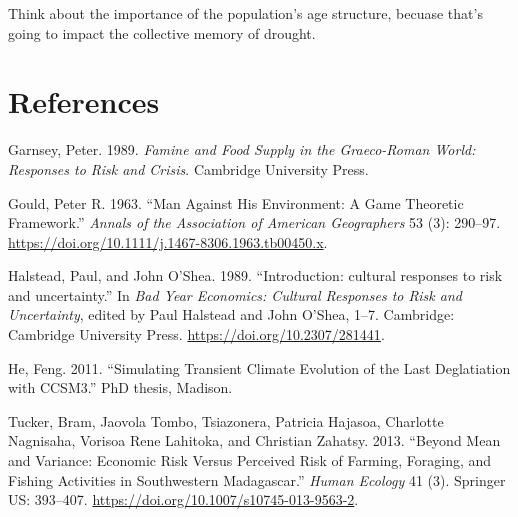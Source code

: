 \documentclass[smallextended]{svjour3}       %
\begin{document}
Think about the importance of the population's age structure, becuase
that's going to impact the collective memory of drought.

\setlength{\parindent}{-0.5in}
\setlength{\leftskip}{0.5in}
\setlength{\parskip}{8pt}

\hypertarget{references}{%
\section*{References}\label{references}}

\hypertarget{refs}{}
\leavevmode\hypertarget{ref-Garnsey1989}{}%
Garnsey, Peter. 1989. \emph{Famine and Food Supply in the Graeco-Roman
World: Responses to Risk and Crisis}. Cambridge University Press.

\leavevmode\hypertarget{ref-GOULD1963a}{}%
Gould, Peter R. 1963. ``Man Against His Environment: A Game Theoretic
Framework.'' \emph{Annals of the Association of American Geographers} 53
(3): 290--97. \url{https://doi.org/10.1111/j.1467-8306.1963.tb00450.x}.

\leavevmode\hypertarget{ref-Halstead1989}{}%
Halstead, Paul, and John O'Shea. 1989. ``Introduction: cultural
responses to risk and uncertainty.'' In \emph{Bad Year Economics:
Cultural Responses to Risk and Uncertainty}, edited by Paul Halstead and
John O'Shea, 1--7. Cambridge: Cambridge University Press.
\url{https://doi.org/10.2307/281441}.

\leavevmode\hypertarget{ref-He2011}{}%
He, Feng. 2011. ``Simulating Transient Climate Evolution of the Last
Deglatiation with CCSM3.'' PhD thesis, Madison.

\leavevmode\hypertarget{ref-Tucker2013}{}%
Tucker, Bram, Jaovola Tombo, Tsiazonera, Patricia Hajasoa, Charlotte
Nagnisaha, Vorisoa Rene Lahitoka, and Christian Zahatsy. 2013. ``Beyond
Mean and Variance: Economic Risk Versus Perceived Risk of Farming,
Foraging, and Fishing Activities in Southwestern Madagascar.''
\emph{Human Ecology} 41 (3). Springer US: 393--407.
\url{https://doi.org/10.1007/s10745-013-9563-2}.



\end{document}
